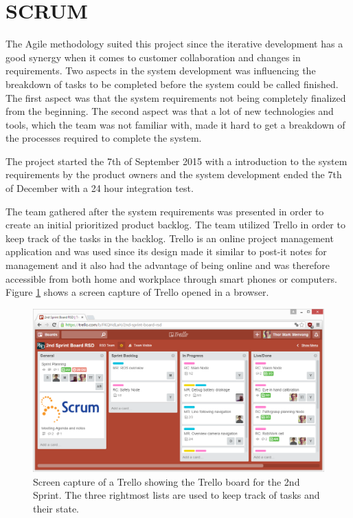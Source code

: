 \section{SCRUM \label{sec:scrum}}


The Agile methodology suited this project since the iterative development has a good synergy when it comes to customer collaboration and changes in requirements. Two aspects in the system development was influencing the breakdown of tasks to be completed before the system could be called finished. The first aspect was that the system requirements not being completely finalized from the beginning. The second aspect was that a lot of new technologies and tools, which the team was not familiar with, made it hard to get a breakdown of the processes required to complete the system.

The project started the 7th of September 2015 with a introduction to the system requirements by the product owners and the system development ended the 7th of December with a 24 hour integration test.

The team gathered after the system requirements was presented in order to create an initial prioritized product backlog. The team utilized Trello \citep{trello} in order to keep track of the tasks in the backlog. Trello is an online project management application and was used since its design made it similar to post-it notes for management and it also had the advantage of being online and was therefore accessible from both home and workplace through smart phones or computers. Figure \ref{fig:trello_cap} shows a screen capture of Trello opened in a browser.
\begin{figure}[H]
	\centering
	\includegraphics[width=\textwidth]{figs/trello_example.png}
	\caption{Screen capture of a Trello showing the Trello board for the 2nd Sprint. The three rightmost lists are used to keep track of tasks and their state.}
	\label{fig:trello_cap}
\end{figure}


